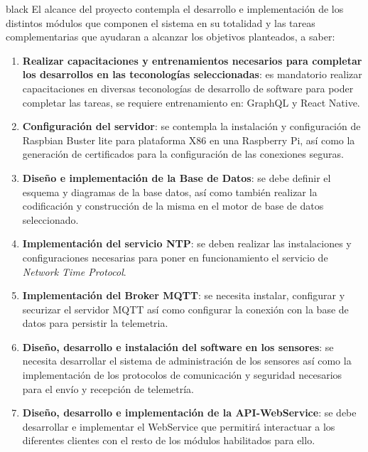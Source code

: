 \documentclass[11pt]{charter}
\begin{document}
\begin{consigna}{black}
%
%
%
El alcance del proyecto contempla el desarrollo e implementación de los distintos módulos que componen el sistema en su totalidad y las tareas complementarias que ayudaran a alcanzar los objetivos planteados, a saber:

\begin{enumerate}
	\item \textbf{Realizar capacitaciones y entrenamientos necesarios para completar los desarrollos en las teconologías seleccionadas}: es mandatorio realizar capacitaciones en diversas teconologías de desarrollo de software para poder completar las tareas, se requiere entrenamiento en: GraphQL y React Native.
	\item \textbf{Configuración del servidor}: se contempla la instalación y configuración de Raspbian Buster lite para plataforma X86 en una Raspberry Pi, así como la generación de certificados para la configuración de las conexiones seguras.	
	\item \textbf{Diseño e implementación de la Base de Datos}: se debe definir el esquema y diagramas de la base datos, así como también realizar la codificación y construcción de la misma en el motor de base de datos seleccionado.
	\item \textbf{Implementación del servicio NTP}: se deben realizar las instalaciones y configuraciones necesarias para poner en funcionamiento el servicio de \textit{Network Time Protocol}.
	\item \textbf{Implementación del Broker MQTT}: se necesita instalar, configurar y securizar el servidor MQTT así como configurar la conexión con la base de datos para persistir la telemetria.
	\item \textbf{Diseño, desarrollo e instalación del software en los sensores}: se necesita desarrollar el sistema de administración de los sensores así como la implementación de los protocolos de comunicación y seguridad necesarios para el envío y recepción de telemetría.
	\item \textbf{Diseño, desarrollo e implementación de la API-WebService}: se debe desarrollar e implementar el WebService que permitirá interactuar a los diferentes clientes con el resto de los módulos habilitados para ello.

\end{enumerate}
\end{consigna}
\end{document}
